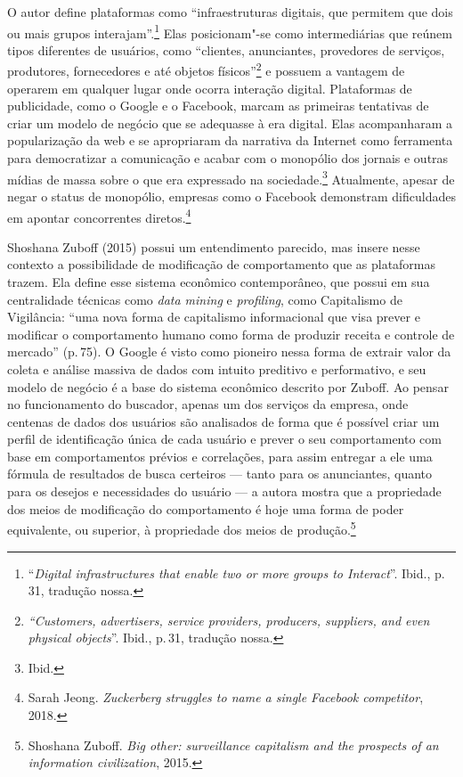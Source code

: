 O autor define plataformas como ``infraestruturas digitais, que permitem
que dois ou mais grupos interajam''.\footnote{``\emph{Digital infrastructures
  that enable two or more groups to Interact}''. Ibid., p.\,31, tradução
nossa.} Elas posicionam"-se como intermediárias que reúnem tipos
diferentes de usuários, como ``clientes, anunciantes, provedores de
serviços, produtores, fornecedores e até objetos físicos''\footnote{\emph{``Customers,
  advertisers, service providers, producers, suppliers, and even
  physical objects}''. Ibid., p.\,31, tradução nossa.} e possuem a vantagem
de operarem em qualquer lugar onde ocorra interação digital. Plataformas
de publicidade, como o Google e o Facebook, marcam as primeiras
tentativas de criar um modelo de negócio que se adequasse à era digital.
Elas acompanharam a popularização da web e se apropriaram da narrativa
da Internet como ferramenta para democratizar a comunicação e acabar com
o monopólio dos jornais e outras mídias de massa sobre o que era
expressado na sociedade.\footnote{Ibid.} Atualmente, apesar de negar o
status de monopólio, empresas como o Facebook demonstram dificuldades em
apontar concorrentes diretos.\footnote{Sarah Jeong. \emph{Zuckerberg struggles to name a single Facebook competitor}, 2018.}

Shoshana Zuboff (2015) possui um entendimento parecido, mas insere nesse
contexto a possibilidade de modificação de comportamento que as
plataformas trazem. Ela define esse sistema econômico contemporâneo, que
possui em sua centralidade técnicas como \emph{data mining} e
\emph{profiling}, como Capitalismo de Vigilância: ``uma nova forma de
capitalismo informacional que visa prever e modificar o comportamento
humano como forma de produzir receita e controle de mercado'' (p.\,75). O
Google é visto como pioneiro nessa forma de extrair valor da coleta e
análise massiva de dados com intuito preditivo e performativo, e seu
modelo de negócio é a base do sistema econômico descrito por Zuboff. Ao
pensar no funcionamento do buscador, apenas um dos serviços da empresa,
onde centenas de dados dos usuários são analisados de forma que é
possível criar um perfil de identificação única de cada usuário e prever
o seu comportamento com base em comportamentos prévios e correlações,
para assim entregar a ele uma fórmula de resultados de busca certeiros
--- tanto para os anunciantes, quanto para os desejos e necessidades do
usuário --- a autora mostra que a propriedade dos meios de modificação do
comportamento é hoje uma forma de poder equivalente, ou superior, à
propriedade dos meios de produção.\footnote{Shoshana Zuboff. \emph{Big other: surveillance capitalism and the
prospects of an information civilization}, 2015.}

